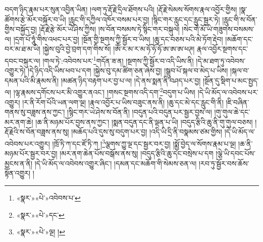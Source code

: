 བདག་ཉིད་རྣམ་པར་སུན་འབྱིན་ཡིན། །ལག་ཏུ་རྡོ་རྗེ་དྲིལ་ཐོགས་པའི། །རྡོ་རྗེ་སེམས་སོགས་རྣལ་འབྱོར་གྱིས། །སྣ་ཚོགས་རྩེ་མོར་བསྐོར་བ་ཡི། །རླུང་གི་དཀྱིལ་འཁོར་བསམ་པར་བྱ། །སྙིང་གར་རླུང་དང་རླུང་སྦྱར་ཏེ། །རླུང་གི་ས་བོན་གྱིས་བསྐྱོད་བྱ། །རྡོ་རྗེ་རྩེ་མོར་ཡེ་ཤེས་ཀྱིས། །ས་བོན་བསམས་ཏེ་སྙིང་གར་བསྐུལ། །སེང་གེ་མོ་ཡི་གཟུགས་བསམས་ལ། །དྲག་པོ་ཧཱུཾ་གིས་འཕང་པར་བྱ། །སྔོན་གྱི་སྔགས་ཀྱི་སྦྱོར་བ་ཡིས། །ཆུ་དང་བཅས་པའི་མེ་ཏོག་རྡེབ། །མཆོག་དང་བར་མ་ཐ་མ་ཡི། །སྐྱེས་བུའི་བྱེ་བྲག་དག་གིས་སོ། །ཨོཾ་ར་མ་ར་མ་ཧོ་ཧོ་ཧོ་ཨ་ཨ་ཨ་ཕཊ། རྣལ་འབྱོར་སྔགས་དང་དབང་བསྐུར་ལ། །གལ་ཏེ་:འབེབས་པར་\footnote{«སྣར་»«པེ་»འབེབས་པ་}གདོན་ཟ་ན། །སྔགས་ཀྱི་སྦྱོར་བ་འདི་ཡིས་ནི། །དེ་མ་ཐག་ཏུ་འབེབས་འགྱུར་ཏེ། །དེ་ཉིད་འདི་ཡིས་ཕབ་པ་དག །སྐྱེས་བུ་དམ་ཚིག་ཅན་ཞེས་བྱ། །སྒྲུབ་པོ་སྐལ་བ་མེད་པ་ཡིས། །སྐལ་བ་དམན་པའི་མི་རྣམས་ནི། །མཚན་ཉིད་བརྟག་པར་བྱ་པ་ལ། །དེ་ནས་སྨན་ནི་བཤད་པར་བྱ། །སྔོན་དུ་སྡིག་པ་མང་སྤྱད་ལ། །ལྷ་རྣམས་དགོངས་པར་མི་འགྱུར་ནའང་། །གསང་སྔགས་འདི་དག་\footnote{«སྣར་»«པེ་»དང་}བདུག་པ་ཡིས། །དེ་ཡི་མོད་ལ་འབེབས་པར་འགྱུར། །ར་ནི་རོག་པོའི་ཡན་ལག་ལྔ། །རྣལ་འབྱོར་པ་ཡིས་བཟུང་ནས་ནི། །ཆུ་དང་མེ་དང་རླུང་གི་ནི། །ཇི་བཞིན་གནས་སུ་བཟླས་ནས་ཀྱང་། །སྙིང་གར་ཡེ་ཤེས་ས་བོན་ནི། །བདུན་པའི་བདུན་པར་སྦྱར་བྱས་ལ། །གུ་གུལ་ཆེ་དང་མར་ནག་ཆེ། །ཆ་ནི་མཉམ་པོར་བྱས་ནས་ཀྱང་། །སྨན་བདུན་དང་ནི་ལྡན་པ་ཡི། །བདུད་རྩིའི་ཆུ་ནི་གུ་གུལ་བཅས། །རྡོ་རྗེའི་ས་བོན་བཟླས་ནས་སུ། །མཆོད་པའི་དུས་སུ་བདུག་པར་བྱ། །འདི་ཡི་དྲི་ནི་བསྣམས་ཙམ་གྱིས། །དེ་ཡི་མོད་ལ་འབེབས་པར་འགྱུར། །ཁྲོ་ཏི་ཀ་དང་ཛོ་ཏི་ཀ །\footnote{«སྣར་»«པེ་»ལྔ། །}ལྕགས་ཀྱུ་ལྔ་དང་སྦྱར་བར་བྱ། །སྨྱོ་བྱེད་ལ་སོགས་རྣམ་པ་ལྔ། །ཆ་ནི་མཉམ་པོར་སྦྱར་བར་བྱ། །མར་ནག་ཆེན་པོས་བསྒོས་ནས་སུ། །བདུད་རྩིའི་ཆུ་དང་བསྲེས་པ་དག །ལྕེ་ཡི་དབང་པོས་མྱངས་ན་ནི། །དེ་ཡི་མོད་ལ་འབེབས་འགྱུར་ཞིང་། །དམན་དང་མཆོག་གི་སེམས་ཅན་ལ། །རབ་ཏུ་སྦྱོར་བས་ཆོས་སྟོན་འགྱུར། །
